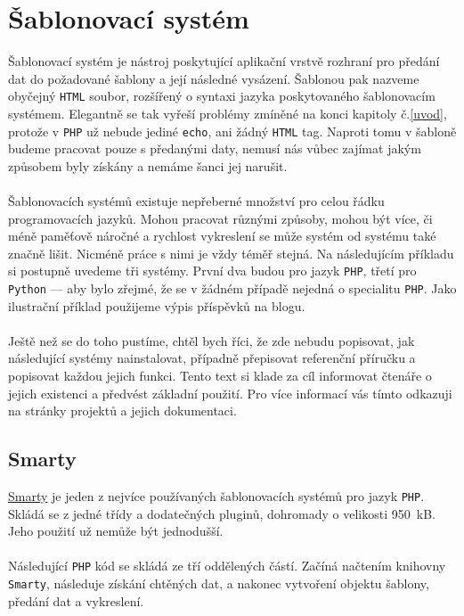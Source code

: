 \documentclass[10pt,a4paper]{article}
\begin{document}
	\section{Šablonovací systém}
		Šablonovací systém je nástroj poskytující aplikační vrstvě rozhraní pro předání dat do požadované šablony a její následné vysázení. Šablonou pak nazveme obyčejný \texttt{HTML} soubor, rozšířený o syntaxi jazyka poskytovaného šablonovacím systémem. Elegantně se tak vyřeší problémy zmíněné na konci kapitoly č.\ref{uvod}, protože v \texttt{PHP} už nebude jediné \texttt{echo}, ani žádný \texttt{HTML} tag. Naproti tomu v šabloně budeme pracovat pouze s předanými daty, nemusí nás vůbec zajímat jakým způsobem byly získány a nemáme šanci jej narušit.
		\\
		\\
		Šablonovacích systémů existuje nepřeberné množství pro celou řádku programovacích jazyků. Mohou pracovat různými způsoby, mohou být více, či méně paměťově náročné a rychlost vykreslení se může systém od systému také značně lišit. Nicméně práce s nimi je vždy téměř stejná. Na následujícím příkladu si postupně uvedeme tři systémy. První dva budou pro jazyk \texttt{PHP}, třetí pro \texttt{Python} --- aby bylo zřejmé, že se v žádném případě nejedná o specialitu \texttt{PHP}. Jako ilustrační příklad použijeme výpis příspěvků na blogu.
		\\
		\\
		Ještě než se do toho pustíme, chtěl bych říci, že zde nebudu popisovat, jak následující systémy nainstalovat, případně přepisovat referenční příručku a popisovat každou jejich funkci. Tento text si klade za cíl informovat čtenáře o jejich existenci a předvést základní použití. Pro více informací vás tímto odkazuji na stránky projektů a jejich dokumentaci.

		\newpage
		\subsection{Smarty}
			\href{http://www.smarty.net}{Smarty} je jeden z nejvíce používaných šablonovacích systémů pro jazyk \texttt{PHP}. Skládá se z jedné třídy a dodatečných pluginů, dohromady o velikosti 950~kB. Jeho použití už nemůže být jednodušší.
			\\
			\\
			Následující \texttt{PHP} kód se skládá ze tří oddělených částí. Začíná načtením knihovny \texttt{Smarty}, následuje získání chtěných dat, a nakonec vytvoření objektu šablony, předání dat a vykreslení.
\end{document}
